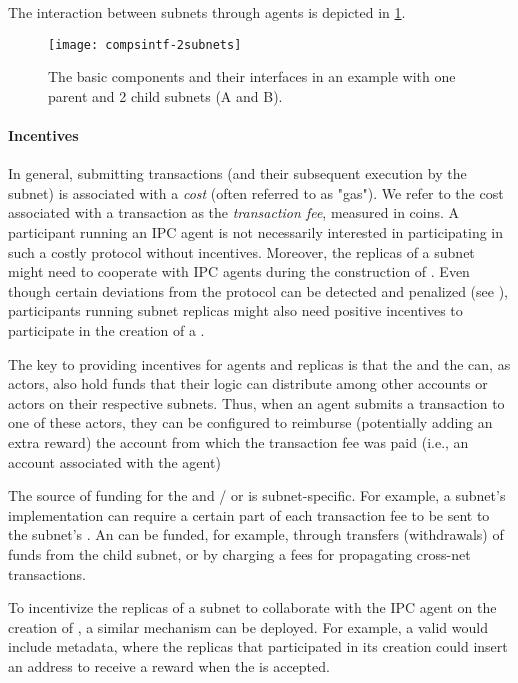 The interaction between subnets through \ipc agents is depicted in \cref{fig:interfaces}.

\begin{figure}[ht]
     \centering
     \texttt{[image: compsintf-2subnets]}
     \caption{The basic \ipc components and their interfaces in an example with one parent and 2 child subnets (A and B). }
     \label{fig:interfaces}
 \end{figure}

\paragraph{Incentives}

In general, submitting transactions (and their subsequent execution by the subnet) is associated with a \emph{cost} (often referred to as "gas").
We refer to the cost associated with a transaction as the \emph{transaction fee}, measured in coins.
A participant running an IPC agent is not necessarily interested in participating in such a costly protocol without incentives.
Moreover, the replicas of a subnet might need to cooperate with IPC agents during the construction of \pofsFull.
Even though certain deviations from the protocol can be detected and penalized (see ),
participants running subnet replicas might also need positive incentives to participate in the creation of a \pof.

The key to providing incentives for \ipc agents and replicas is that the \sa and the \gw can,
as actors, also hold funds that their logic can distribute among other accounts or actors on their respective subnets.
Thus, when an \ipc agent submits a transaction to one of these actors, they can be configured to reimburse (potentially adding an extra reward)
the account from which the transaction fee was paid (i.e., an account associated with the \ipc agent)%

The source of funding for the \gw and / or \sa is subnet-specific.
For example, a subnet’s implementation can require a certain part of each transaction fee to be sent to the subnet's \gw.
An \sa can be funded, for example, through transfers (withdrawals) of funds from the child subnet, or by charging a fees for propagating cross-net transactions.

To incentivize the replicas of a subnet to collaborate with the IPC agent on the creation of \pofsFull, a similar mechanism can be deployed.
For example, a valid \pof would include metadata, where the replicas that participated in its creation could insert an address to receive a reward when the \pof is accepted.

